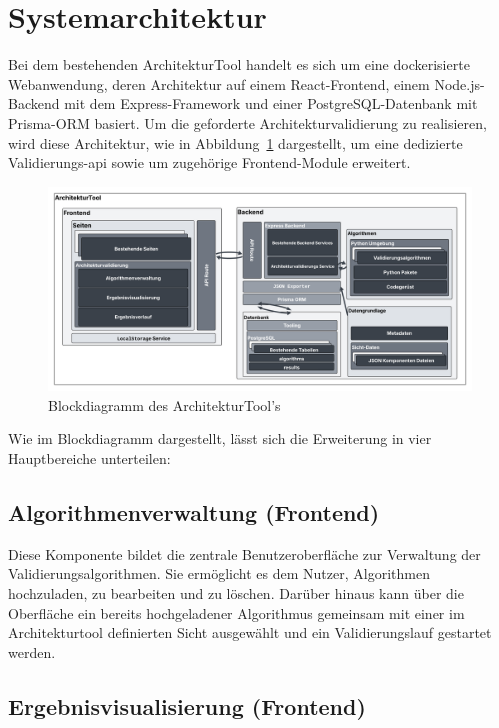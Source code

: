 \section{Systemarchitektur}
\label{sec:sysarchitektur}

Bei dem bestehenden ArchitekturTool handelt es sich um eine dockerisierte Webanwendung, deren Architektur auf einem React-Frontend, einem Node.js-Backend mit dem Express-Framework und einer PostgreSQL-Datenbank mit Prisma-ORM basiert. Um die geforderte Architekturvalidierung zu realisieren, wird diese Architektur, wie in Abbildung~\ref{fig:blockdiagram} dargestellt, um eine dedizierte Validierungs-\gls{api} sowie um zugehörige Frontend-Module erweitert.


\begin{figure}[h!]
  \centering
  \includegraphics[width=\textwidth]{figures/04Konzeption/Blockdiagram.png}
  \caption{Blockdiagramm des ArchitekturTool's}
  \label{fig:blockdiagram}
\end{figure}


Wie im Blockdiagramm dargestellt, lässt sich die Erweiterung in vier Hauptbereiche unterteilen:

\subsection*{Algorithmenverwaltung (Frontend)}

Diese Komponente bildet die zentrale Benutzeroberfläche zur Verwaltung der Validierungsalgorithmen. Sie ermöglicht es dem Nutzer, Algorithmen hochzuladen, zu bearbeiten und zu löschen. Darüber hinaus kann über die Oberfläche ein bereits hochgeladener Algorithmus gemeinsam mit einer im Architekturtool definierten Sicht ausgewählt und ein Validierungslauf gestartet werden.

\subsection*{Ergebnisvisualisierung (Frontend)}

